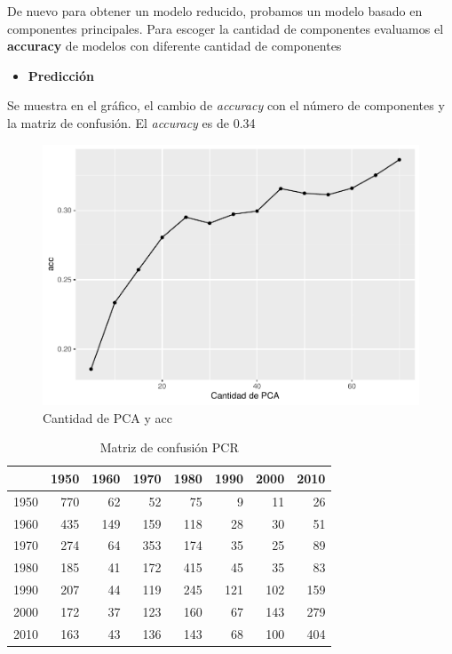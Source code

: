 \documentclass[conference,final,]{IEEEtran}
\providecommand{\tightlist}{%
  \setlength{\itemsep}{0pt}\setlength{\parskip}{0pt}}
\begin{document}
De nuevo para obtener un modelo reducido, probamos un modelo basado en
componentes principales. Para escoger la cantidad de componentes
evaluamos el \textbf{accuracy} de modelos con diferente cantidad de
componentes

\begin{itemize}
\tightlist
\item
  \textbf{Predicción}
\end{itemize}

Se muestra en el gráfico, el cambio de \emph{accuracy} con el número de
componentes y la matriz de confusión. El \emph{accuracy} es de 0.34

\begin{figure}[H]

{\centering \includegraphics[width=0.6\linewidth]{YearPrediction_Reporte_files/figure-latex/unnamed-chunk-20-1} 

}

\caption{Cantidad de PCA y acc}\label{fig:unnamed-chunk-20}
\end{figure}

\begin{table}[!t]
\centering
\caption{Matriz de confusión PCR} 
\begin{tabular}{r|rrrrrrr}
  \hline
 & 1950 & 1960 & 1970 & 1980 & 1990 & 2000 & 2010 \\ 
  \hline
1950 & 770 &  62 &  52 &  75 &   9 &  11 &  26 \\ 
  1960 & 435 & 149 & 159 & 118 &  28 &  30 &  51 \\ 
  1970 & 274 &  64 & 353 & 174 &  35 &  25 &  89 \\ 
  1980 & 185 &  41 & 172 & 415 &  45 &  35 &  83 \\ 
  1990 & 207 &  44 & 119 & 245 & 121 & 102 & 159 \\ 
  2000 & 172 &  37 & 123 & 160 &  67 & 143 & 279 \\ 
  2010 & 163 &  43 & 136 & 143 &  68 & 100 & 404 \\ 
   \hline
\end{tabular}
\end{table}
\end{document}
